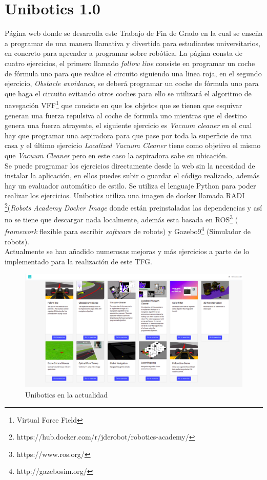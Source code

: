 \section{Unibotics 1.0}

Página web donde se desarrolla este Trabajo de Fin  de Grado en la cual se enseña a programar de una manera llamativa y divertida para estudiantes universitarios, en concreto para aprender a programar sobre robótica. La página consta de cuatro ejercicios, el primero llamado \textit{follow line} consiste en programar un coche de fórmula uno para que realice el circuito siguiendo una linea roja, en el segundo ejercicio, \textit{Obstacle avoidance}, se deberá programar un coche de fórmula uno para que haga el circuito evitando otros coches para ello se utilizará el algoritmo de navegación VFF\footnote{Virtual Force Field} que consiste en que los objetos que se tienen que esquivar generan una fuerza repulsiva al coche de formula uno mientras que el destino genera una fuerza atrayente, el siguiente ejercicio es \textit{Vacuum cleaner} en el cual hay que programar una aspiradora para que pase por toda la superficie de una casa y el último ejercicio \textit{Localized Vacuum Cleaner} tiene como objetivo el mismo que \textit{Vacuum Cleaner} pero en este caso la aspiradora sabe su ubicación.\\

\newpage
Se puede programar los ejercicios directamente desde la web sin la necesidad de instalar la aplicación, en ellos puedes subir o guardar el código realizado, además hay un evaluador automático de estilo. Se utiliza el lenguaje Python para poder realizar los ejercicios. Unibotics utiliza una imagen de docker llamada RADI \footnote{https://hub.docker.com/r/jderobot/robotics-academy/}(\textit{Robots Academy Docker Image} donde están preinstaladas las dependencias y así no se tiene que descargar nada localmente, además esta basada en ROS\footnote{https://www.ros.org/} ( \textit{framework} flexible para escribir \textit{software} de robots) y Gazebo9\footnote{http://gazebosim.org/} (Simulador de robots).\cite{robotics}\\

Actualmente se han añadido numerosas mejoras y más ejercicios a parte de lo implementado para la realización de este TFG.

\begin{figure}[H]
    \centering
    \includegraphics[width=15cm, keepaspectratio]{img/unibotics.png}
    \caption{Unibotics en la actualidad}
    \label{fig:unibotics}
\end{figure}

